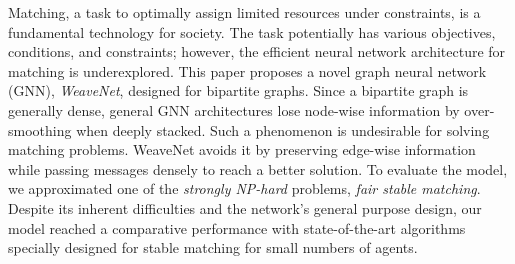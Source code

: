 Matching, a task to optimally assign limited resources under constraints, is a fundamental technology for society.
The task potentially has various objectives, conditions, and constraints; however, the efficient neural network architecture for matching is underexplored.
This paper proposes a novel graph neural network (GNN), \textit{WeaveNet}, designed for bipartite graphs.
Since a bipartite graph is generally dense, general GNN architectures lose node-wise information by over-smoothing when deeply stacked.
Such a phenomenon is undesirable for solving matching problems.
WeaveNet avoids it by preserving edge-wise information while passing messages densely to reach a better solution.
To evaluate the model, we approximated one of the \textit{strongly NP-hard} problems, \textit{fair stable matching}.
Despite its inherent difficulties and the network's general purpose design, our model reached a comparative performance with state-of-the-art algorithms specially designed for stable matching for small numbers of agents.

% 

